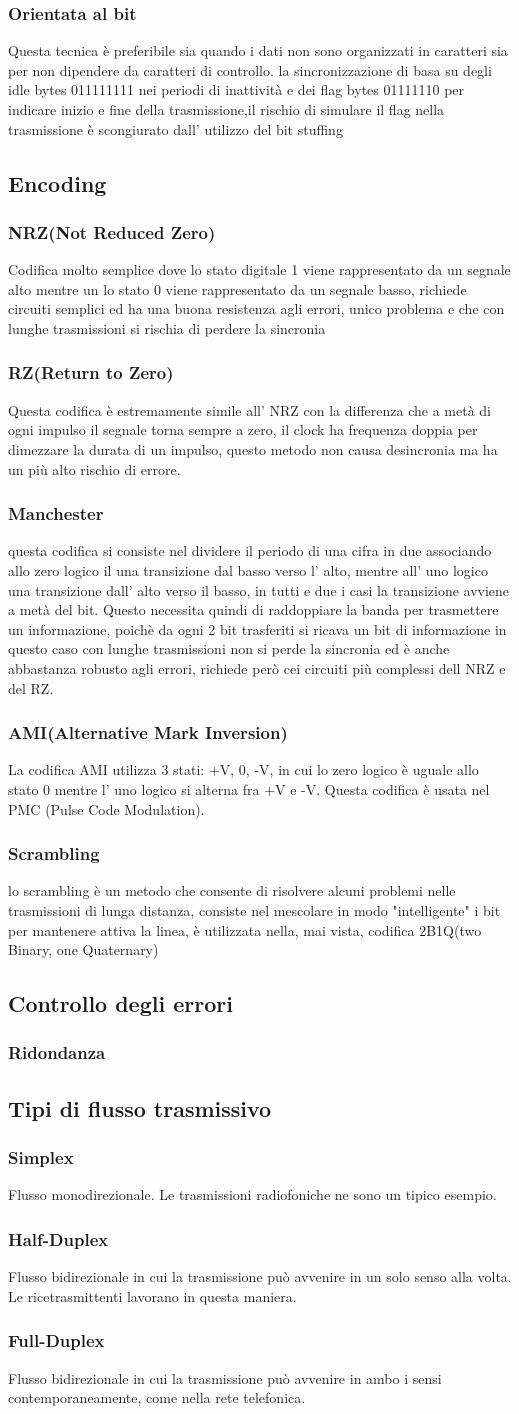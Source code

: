 \documentclass[a4paper,11pt]{article}
\def\sub#1{\subsection{#1}\label{#1}}
\def\subsub#1{\subsubsection{#1}\label{#1}}
\begin{document}
\subsub{Orientata al bit}
 Questa tecnica è preferibile sia quando i dati non sono organizzati in caratteri sia per non dipendere da caratteri di controllo.
 la sincronizzazione di basa su degli idle bytes 011111111 nei periodi di inattività e dei flag bytes 01111110 per indicare inizio e fine della trasmissione,il rischio di simulare il flag nella trasmissione è scongiurato dall' utilizzo del bit stuffing
\sub{Encoding}
\subsub{NRZ(Not Reduced Zero)}
Codifica molto semplice dove lo stato digitale 1 viene rappresentato da un segnale alto mentre un lo stato 0 viene rappresentato da un segnale basso, richiede circuiti semplici ed ha una buona resistenza agli errori, unico problema e che con lunghe trasmissioni si rischia di perdere la sincronia
\subsub{RZ(Return to Zero)}
Questa codifica è estremamente simile all' NRZ con la differenza che a metà di ogni impulso il segnale torna sempre a zero, il clock ha frequenza doppia per dimezzare la durata di un impulso, questo metodo non causa desincronia ma ha un più alto rischio di errore.
\subsub{Manchester}
questa codifica si consiste nel dividere il periodo di una cifra in due associando allo zero logico il una transizione dal basso verso l' alto,
mentre all' uno logico una transizione dall' alto verso il basso, in tutti e due i casi la transizione avviene a metà del bit.
Questo necessita quindi di raddoppiare la banda per trasmettere un informazione, poichè da ogni 2 bit trasferiti si ricava un bit di informazione
in questo caso con lunghe trasmissioni non si perde la sincronia ed è anche abbastanza robusto agli errori, richiede però cei circuiti più complessi dell NRZ e del RZ.
\subsub{AMI(Alternative Mark Inversion)}
La codifica AMI utilizza 3 stati: +V, 0, -V, in cui lo zero logico è uguale allo stato 0 mentre l' uno logico si alterna fra +V e -V.
Questa codifica è usata nel PMC (Pulse Code Modulation). 
\subsub{Scrambling}
lo scrambling è un metodo che consente di risolvere alcuni problemi nelle trasmissioni di lunga distanza, consiste nel mescolare in modo "intelligente" i bit per mantenere attiva la linea, è utilizzata nella, mai vista, codifica 2B1Q(two Binary, one Quaternary)
\sub{Controllo degli errori} 
\subsub{Ridondanza}

\sub{Tipi di flusso trasmissivo}
\subsub{Simplex} Flusso monodirezionale. Le trasmissioni radiofoniche ne sono un tipico esempio. 
\subsub{Half-Duplex} Flusso bidirezionale in cui la trasmissione può avvenire in un solo senso alla volta. Le ricetrasmittenti lavorano in questa maniera. 
\subsub{Full-Duplex} Flusso bidirezionale in cui la trasmissione può avvenire in ambo i sensi contemporaneamente, come nella rete telefonica. 
\end{document}
